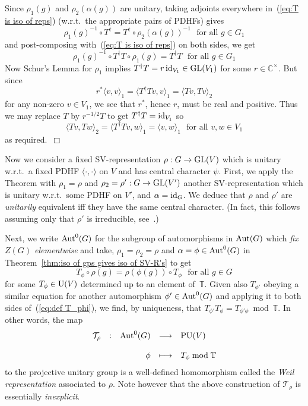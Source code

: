 \documentclass[12pt]{article}
\newcommand{\Aut}{{\rm Aut}}
\newcommand{\bbC}{\ensuremath{\mathbb{C}}}\newcommand{\bbCp}{\ensuremath{\mathbb{C}_p}}
\newcommand{\bbT}{\ensuremath{\mathbb{T}}}
\newcommand{\cT}{\ensuremath{\mathcal{T}}}
\newcommand{\displaymapdef}[5]
{
	\begin{array}{rcrcl}
		#1 &:& #2 &\longrightarrow& #3 \\
		& &    &                    \\
		& & #4 &\longmapsto    & #5
	\end{array}
}
\newcommand{\ePf}{~$\Box$\vertsp\par}%
\newcommand{\GL}{{\rm GL}}
\newcommand{\id}{{\rm id}}
\newcommand{\inv}{^{-1}}%
\newcommand{\vertsp}{\vspace{1ex}}
\begin{document}
Since $\rho_1(g)$ and $\rho_2(\alpha(g))$ are unitary, taking adjoints everywhere in~(\ref{eq:T is iso of reps}) (w.r.t.\ the appropriate pairs of PDHFs) gives
$$
\rho_1(g)\inv\circ T^\dagger=T^\dagger\circ \rho_2(\alpha(g))\inv\ \ \ \mbox{for all $g\in G_1$}
$$  
and post-composing with~(\ref{eq:T is iso of reps}) on both sides, we get
$$
\rho_1(g)\inv\circ T^\dagger T\circ \rho_1(g)=T^\dagger T\ \ \ \mbox{for all $g\in G_1$}
$$
Now Schur's Lemma for $\rho_1$ implies $T^\dagger T=r\,{\rm id}_{V_1}\in\GL(V_1)$ for some  $r\in\bbC^\times$. But since 
$$r^\ast\langle v ,v\rangle_1=\langle T^\dagger T v , v\rangle_1=\langle T v ,T v\rangle_2$$ for any non-zero $v\in V_1$, we see that $r^\ast$, hence $r$, must be real and positive. Thus we may replace $T$ by $r^{-1/2}T$ to get $T^\dagger T=\id_{V_1}$ so 
$$
\langle Tv, Tw\rangle_2=\langle T^\dagger T v, w\rangle_1=\langle v, w\rangle_1\ \ \ \mbox{for all $v,w\in V_1$}
$$
as required.\ePf
\noindent Now we consider a fixed SV-representation $\rho:G\rightarrow   {\rm GL}(V)$ which is unitary w.r.t.\ a fixed PDHF $\langle\cdot,\cdot\rangle$ on $V$ and has central character $\psi$. First, we apply the Theorem with $\rho_1=\rho$ and  $\rho_2=\rho': G\rightarrow   {\GL}(V')$ another SV-representation  which is unitary w.r.t.\ some PDHF on $V'$, and  
$\alpha=\id_G$.  
We deduce that $\rho$ and $\rho'$ are  \textit{unitarily} equivalent iff they have the same central character. (In fact, this follows assuming only that $\rho'$ is irreducible, see~\cite[Prop 3.2.1]{Howe}.)

Next, we write $\Aut^{0}(G)$ for the subgroup of automorphisms in $\Aut(G)$ which \textit{fix $Z(G)$ elementwise} and take, $\rho_1=\rho_2=\rho$ and  $\alpha=\phi\in\Aut^{0}(G)$ in Theorem~\ref{thm:iso of gps gives iso of SV-R's}  to get 
\begin{equation}\label{eq:def T_phi}
	T_\phi\circ\rho(g)= \rho(\phi(g))\circ T_\phi
	\ \ \ \mbox{for all $g\in G$}
\end{equation}
for some $T_\phi\in   {\rm U}(V)$ determined up to an element of~\bbT. Given also $T_{\phi'}$ obeying a similar equation for another automorphism $\phi'\in \Aut^0(G)$ and applying it to both sides of~(\ref{eq:def T_phi}), we find, by uniqueness, that $T_{\phi'}T_{\phi}=T_{\phi'\phi}\bmod \bbT$. In other words, the map 
\begin{equation}\label{eq:def of Weil Rep}
	\displaymapdef{\cT_\rho}{\Aut^0(G)}{{\rm PU}(V)}{\phi}{T_\phi\bmod\bbT}
\end{equation}
to the projective unitary group is a well-defined homomorphism called the {\em Weil representation} associated to $\rho$. Note however that the above construction of $\cT_\rho$ is essentially \textit{inexplicit}.
\end{document}
